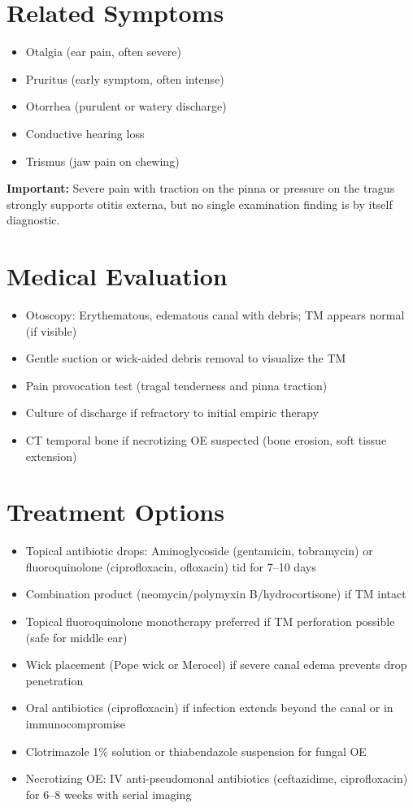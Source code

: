 \section*{Related Symptoms}
\begin{itemize}
  \item Otalgia (ear pain, often severe)
  \item Pruritus (early symptom, often intense)
  \item Otorrhea (purulent or watery discharge)
  \item Conductive hearing loss
  \item Trismus (jaw pain on chewing)
\end{itemize}
\textbf{Important:} Severe pain with traction on the pinna or pressure on the tragus strongly supports otitis externa, but no single examination finding is by itself diagnostic.

\section*{Medical Evaluation}
\begin{itemize}
  \item Otoscopy: Erythematous, edematous canal with debris; TM appears normal (if visible)
  \item Gentle suction or wick-aided debris removal to visualize the TM
  \item Pain provocation test (tragal tenderness and pinna traction)
  \item Culture of discharge if refractory to initial empiric therapy
  \item CT temporal bone if necrotizing OE suspected (bone erosion, soft tissue extension)
\end{itemize}

\section*{Treatment Options}
\begin{itemize}
  \item Topical antibiotic drops: Aminoglycoside (gentamicin, tobramycin) or fluoroquinolone (ciprofloxacin, ofloxacin) tid for 7--10 days
  \item Combination product (neomycin/polymyxin B/hydrocortisone) if TM intact
  \item Topical fluoroquinolone monotherapy preferred if TM perforation possible (safe for middle ear)
  \item Wick placement (Pope wick or Merocel) if severe canal edema prevents drop penetration
  \item Oral antibiotics (ciprofloxacin) if infection extends beyond the canal or in immunocompromise
  \item Clotrimazole 1\% solution or thiabendazole suspension for fungal OE
  \item Necrotizing OE: IV anti-pseudomonal antibiotics (ceftazidime, ciprofloxacin) for 6--8 weeks with serial imaging
\end{itemize}

